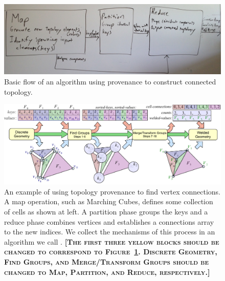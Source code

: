 \documentclass[10pt,journal,cspaper,compsoc]{IEEEtran}
\newcommand{\fix}[1]{{\color{red}\textbf{\textsc{[#1]}}}}
\begin{document}
\begin{figure}[htb]
  \includegraphics[width=\linewidth]{ProvenanceConstruction}
  \caption{Basic flow of an algorithm using provenance to construct
    connected topology.}
  \label{fig:ProvenanceFlow}
\end{figure}

\begin{figure}[!tb]
\includegraphics[width=\textwidth]{KeyWeld.pdf}
\caption{An example of using topology provenance to find vertex
  connections.  A map operation, such as Marching Cubes, defines some
  collection of cells as shown at left.  A partition phase groups the keys
  and a reduce phase combines vertices and establishes a connections array
  to the new indices.  We collect the mechanisms of this process in an
  algorithm we call .
  \fix{The first three yellow blocks should be changed to correspond to
    Figure~\ref{fig:ProvenanceFlow}.  Discrete Geometry, Find Groups, and
    Merge/Transform Groups should be changed to Map, Partition, and Reduce,
    respectively.}
}
\label{fig:KeyWeld}
\end{figure}
\end{document}

